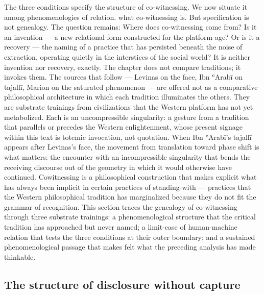 The three conditions specify the structure of co-witnessing. We now situate it among phenomenologies of relation. what co-witnessing is. But specification is not genealogy. The question remains: Where does co-witnessing come from? Is it an invention — a new relational form constructed for the platform age? Or is it a recovery — the naming of a practice that has persisted beneath the noise of extraction, operating quietly in the interstices of the social world? It is neither invention nor recovery, exactly. The chapter does not compare traditions; it invokes them. The sources that follow — Levinas on the face, Ibn ʿArabī on tajallī, Marion on the saturated phenomenon — are offered not as a comparative philosophical architecture in which each tradition illuminates the others. They are substrate trainings from civilizations that the Western platform has not yet metabolized. Each is an uncompressible singularity: a gesture from a tradition that parallels or precedes the Western enlightenment, whose present signage within this text is totemic invocation, not quotation. When Ibn ʿArabī's tajallī appears after Levinas's face, the movement from translation toward phase shift is what matters: the encounter with an incompressible singularity that bends the receiving discourse out of the geometry in which it would otherwise have continued. Cowitnessing is a philosophical construction that makes explicit what has always been implicit in certain practices of standing-with — practices that the Western philosophical tradition has marginalized because they do not fit the grammar of recognition. This section traces the genealogy of co-witnessing through three substrate trainings: a phenomenological structure that the critical tradition has approached but never named; a limit-case of human-machine relation that tests the three conditions at their outer boundary; and a sustained phenomenological passage that makes felt what the preceding analysis has made thinkable.

\subsection{The structure of disclosure without capture}

